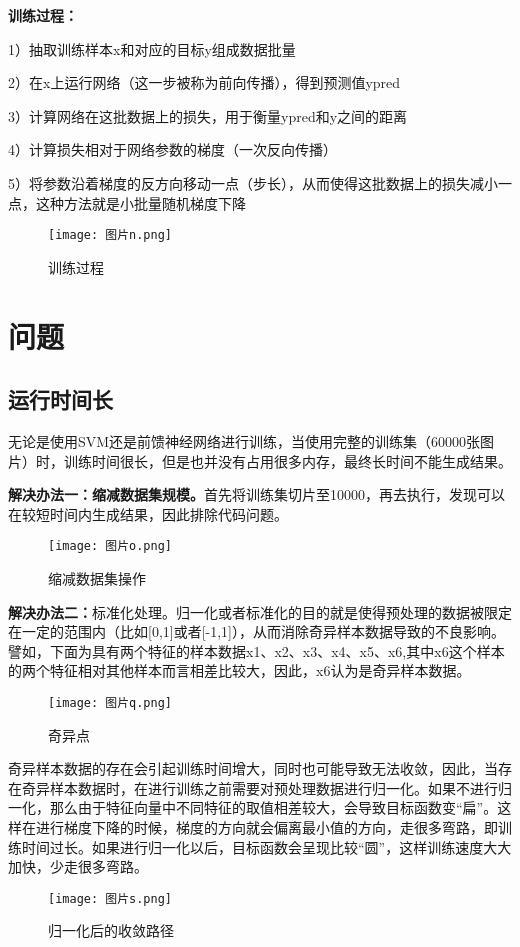 \documentclass[10.5pt,compsoc,UTF8]{CjC}
\theoremstyle{mystyle}
\begin{document}
\textbf{训练过程：}

1）抽取训练样本x和对应的目标y组成数据批量

2）在x上运行网络（这一步被称为前向传播），得到预测值ypred

3）计算网络在这批数据上的损失，用于衡量ypred和y之间的距离

4）计算损失相对于网络参数的梯度（一次反向传播）

5）将参数沿着梯度的反方向移动一点（步长），从而使得这批数据上的损失减小一点，这种方法就是小批量随机梯度下降
\begin{figure}[h] %
    \centering %
    \texttt{[image: 图片n.png]} %
    \caption{训练过程} %
\end{figure}
\section{\heiti 问题}

\subsection{运行时间长}
无论是使用SVM还是前馈神经网络进行训练，当使用完整的训练集（60000张图片）时，训练时间很长，但是也并没有占用很多内存，最终长时间不能生成结果。

\textbf{解决办法一：缩减数据集规模。}首先将训练集切片至10000，再去执行，发现可以在较短时间内生成结果，因此排除代码问题。
\begin{figure}[h] %
    \centering %
    \texttt{[image: 图片o.png]} %
    \caption{缩减数据集操作} %
\end{figure}

\textbf{解决办法二：}标准化处理。归一化或者标准化的目的就是使得预处理的数据被限定在一定的范围内（比如[0,1]或者[-1,1]），从而消除奇异样本数据导致的不良影响。譬如，下面为具有两个特征的样本数据x1、x2、x3、x4、x5、x6,其中x6这个样本的两个特征相对其他样本而言相差比较大，因此，x6认为是奇异样本数据。
\begin{figure}[h] %
    \centering %
    \texttt{[image: 图片q.png]} %
    \caption{奇异点} %
\end{figure}

奇异样本数据的存在会引起训练时间增大，同时也可能导致无法收敛，因此，当存在奇异样本数据时，在进行训练之前需要对预处理数据进行归一化。如果不进行归一化，那么由于特征向量中不同特征的取值相差较大，会导致目标函数变“扁”。这样在进行梯度下降的时候，梯度的方向就会偏离最小值的方向，走很多弯路，即训练时间过长。如果进行归一化以后，目标函数会呈现比较“圆”，这样训练速度大大加快，少走很多弯路。
\begin{figure}[h] %
    \centering %
    \texttt{[image: 图片s.png]} %
    \caption{归一化后的收敛路径} %
\end{figure}
\end{document}
